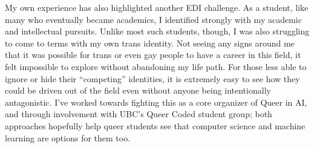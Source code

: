 \documentclass[12pt]{article}
\begin{document}
My own experience has also highlighted another EDI challenge.
As a student, like many who eventually became academics, I identified strongly with my academic and intellectual pursuits.
Unlike most such students, though, I was also struggling to come to terms with my own trans identity.
Not seeing any signs around me that it was possible for trans or even gay people to have a career in this field, it felt impossible to explore without abandoning my life path.
For those less able to ignore or hide their ``competing'' identities, it is extremely easy to see how they could be driven out of the field even without anyone being intentionally antagonistic.
I've worked towards fighting this as a core organizer of Queer in AI, and through involvement with UBC's Queer Coded student group; both approaches hopefully help queer students see that computer science and machine learning are options for them too.
\end{document}
